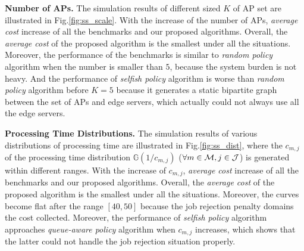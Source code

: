 \textbf{Number of APs.} %
The simulation results of different sized $K$ of AP set are illustrated in Fig.\ref{fig:ss_scale}.
With the increase of the number of APs, \emph{average cost} increase of all the benchmarks and our proposed algorithms.
Overall, the \emph{average cost} of the proposed algorithm is the smallest under all the situations.
Moreover, the performance of the benchmarks is similar to \emph{random policy} algorithm when the number is smaller than $5$, because the system burden is not heavy.
And the performance of \emph{selfish policy} algorithm is worse than \emph{random policy} algorithm before $K=5$ because it generates a static bipartite graph between the set of APs and edge servers, which actually could not always use all the edge servers.

\textbf{Processing Time Distributions.}
The simulation results of various distributions of processing time are illustrated in Fig.\ref{fig:ss_dist}, where the $c_{m,j}$ of the processing time distribution $\mathbb{G}(1/c_{m,j})$ ($\forall m\in\mathcal{M},j\in\mathcal{J}$) is generated within different ranges.
With the increase of $c_{m,j}$, \emph{average cost} increase of all the benchmarks and our proposed algorithms.
Overall, the \emph{average cost} of the proposed algorithm is the smallest under all the situations.
Moreover, the curves become flat after the range $[40,50]$ because the job rejection penalty domains the cost collected.
Moreover, the performance of \emph{selfish policy} algorithm approaches \emph{queue-aware policy} algorithm when $c_{m,j}$ increases, which shows that the latter could not handle the job rejection situation properly.


